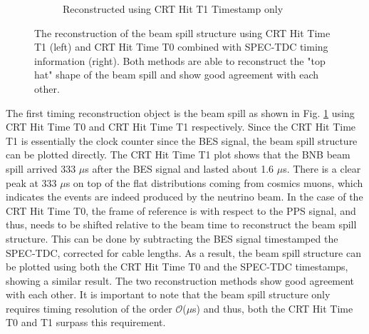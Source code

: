 \begin{figure}[htbp!]
\begin{subfigure}[h]{0.49\linewidth}
\caption{Reconstructed using CRT Hit T1 Timestamp only}
\end{subfigure}%
\caption[topHat]{The reconstruction of the beam spill structure using CRT Hit Time T1 (left) and CRT Hit Time T0 combined with SPEC-TDC timing information (right). 
Both methods are able to reconstruct the "top hat" shape of the beam spill and show good agreement with each other.
}
\label{fig:topHat}
\end{figure}

The first timing reconstruction object is the beam spill as shown in Fig. \ref{fig:topHat} using CRT Hit Time T0 and CRT Hit Time T1 respectively.
Since the CRT Hit Time T1 is essentially the clock counter since the BES signal, the beam spill structure can be plotted directly.
The CRT Hit Time T1 plot shows that the BNB beam spill arrived 333 $\mu$s after the BES signal and lasted about 1.6 $\mu$s.
There is a clear peak at 333 $\mu$s on top of the flat distributions coming from cosmics muons, which indicates the events are indeed produced by the neutrino beam.
In the case of the CRT Hit Time T0, the frame of reference is with respect to the PPS signal, and thus, needs to be shifted relative to the beam time to reconstruct the beam spill structure.
This can be done by subtracting the BES signal timestamped the SPEC-TDC, corrected for cable lengths.
As a result, the beam spill structure can be plotted using both the CRT Hit Time T0 and the SPEC-TDC timestamps, showing a similar result.
The two reconstruction methods show good agreement with each other.
It is important to note that the beam spill structure only requires timing resolution of the order $\mathcal{O}$($\mu$s) and thus, both the CRT Hit Time T0 and T1 surpass this requirement.

